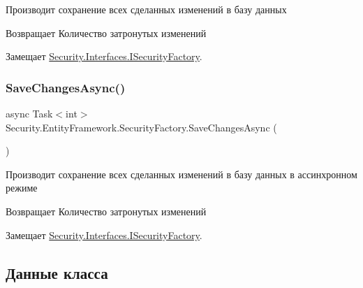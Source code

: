 Производит сохранение всех сделанных изменений в базу данных 

\begin{DoxyReturn}{Возвращает}
Количество затронутых изменений
\end{DoxyReturn}


Замещает \hyperlink{interface_security_1_1_interfaces_1_1_i_security_factory_a2af6dff231f7099ba7d02e2bc569683a}{Security.\+Interfaces.\+I\+Security\+Factory}.

\mbox{\label{class_security_1_1_entity_framework_1_1_security_factory_a92e4049cb25c1cd3b9ca43b1aec096ad}} 
\subsubsection{\texorpdfstring{Save\+Changes\+Async()}{SaveChangesAsync()}}
{\footnotesize\ttfamily async Task$<$int$>$ Security.\+Entity\+Framework.\+Security\+Factory.\+Save\+Changes\+Async (\begin{DoxyParamCaption}{ }\end{DoxyParamCaption})}



Производит сохранение всех сделанных изменений в базу данных в ассинхронном режиме 

\begin{DoxyReturn}{Возвращает}
Количество затронутых изменений
\end{DoxyReturn}


Замещает \hyperlink{interface_security_1_1_interfaces_1_1_i_security_factory}{Security.\+Interfaces.\+I\+Security\+Factory}.



\subsection{Данные класса}
\mbox{\label{class_security_1_1_entity_framework_1_1_security_factory_aabcaa9d3afbf7699b0d6bc97166ed420}} 
